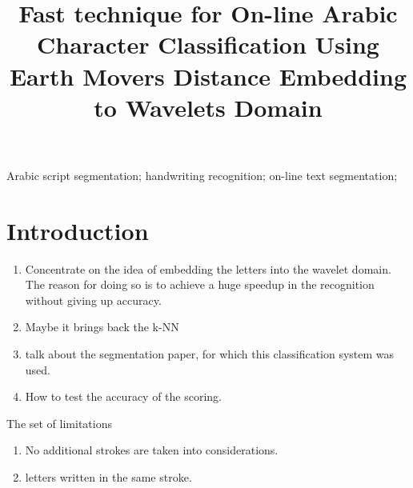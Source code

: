 \documentclass[10pt, conference, compsocconf]{IEEEtran}
\theoremstyle{definition}
\begin{document}
\title{Fast technique for On-line Arabic Character Classification Using Earth Movers Distance Embedding to Wavelets Domain}

\author{
\and
{}
}

\maketitle

\begin{abstract}

\end{abstract}

\begin{IEEEkeywords}

Arabic script segmentation; handwriting recognition; on-line text segmentation; 
\end{IEEEkeywords}

\section{Introduction}

\begin{enumerate}
\item Concentrate on the idea of embedding the letters into the wavelet domain. The reason for doing so is to achieve a huge speedup in the recognition without giving up accuracy.
\item Maybe it brings back the k-NN 
\item talk about the segmentation paper, for which this classification system was used.
\item How to test the accuracy of the scoring.
\end{enumerate}

The set of limitations
\begin{enumerate}
\item No additional strokes are taken into considerations.
\item letters written in the same stroke.
\end{enumerate}
\end{document}
